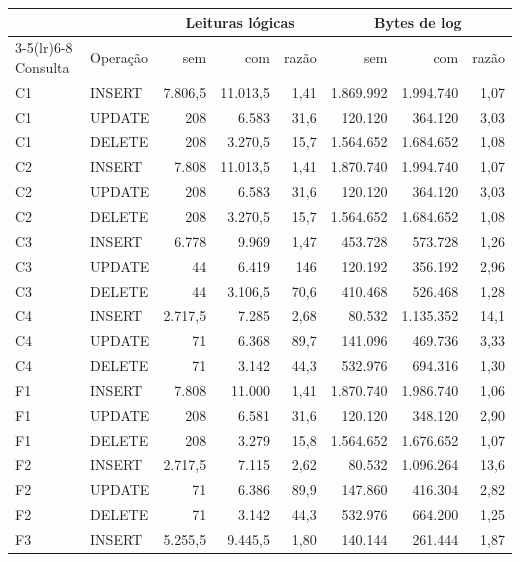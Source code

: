 {\small\setlength{\tabcolsep}{4pt}
\begin{tabular}{llrrrrrr}
\toprule
 &  & \multicolumn{3}{c}{Leituras lógicas} & \multicolumn{3}{c}{Bytes de log} \\
\cmidrule(lr){3-5}\cmidrule(lr){6-8}
Consulta & Operação & sem & com & razão & sem & com & razão \\
\midrule
C1 & INSERT & 7.806,5 & 11.013,5 & 1,41 & 1.869.992 & 1.994.740 & 1,07 \\
C1 & UPDATE & 208 & 6.583 & 31,6 & 120.120 & 364.120 & 3,03 \\
C1 & DELETE & 208 & 3.270,5 & 15,7 & 1.564.652 & 1.684.652 & 1,08 \\
C2 & INSERT & 7.808 & 11.013,5 & 1,41 & 1.870.740 & 1.994.740 & 1,07 \\
C2 & UPDATE & 208 & 6.583 & 31,6 & 120.120 & 364.120 & 3,03 \\
C2 & DELETE & 208 & 3.270,5 & 15,7 & 1.564.652 & 1.684.652 & 1,08 \\
C3 & INSERT & 6.778 & 9.969 & 1,47 & 453.728 & 573.728 & 1,26 \\
C3 & UPDATE & 44 & 6.419 & 146 & 120.192 & 356.192 & 2,96 \\
C3 & DELETE & 44 & 3.106,5 & 70,6 & 410.468 & 526.468 & 1,28 \\
C4 & INSERT & 2.717,5 & 7.285 & 2,68 & 80.532 & 1.135.352 & 14,1 \\
C4 & UPDATE & 71 & 6.368 & 89,7 & 141.096 & 469.736 & 3,33 \\
C4 & DELETE & 71 & 3.142 & 44,3 & 532.976 & 694.316 & 1,30 \\
F1 & INSERT & 7.808 & 11.000 & 1,41 & 1.870.740 & 1.986.740 & 1,06 \\
F1 & UPDATE & 208 & 6.581 & 31,6 & 120.120 & 348.120 & 2,90 \\
F1 & DELETE & 208 & 3.279 & 15,8 & 1.564.652 & 1.676.652 & 1,07 \\
F2 & INSERT & 2.717,5 & 7.115 & 2,62 & 80.532 & 1.096.264 & 13,6 \\
F2 & UPDATE & 71 & 6.386 & 89,9 & 147.860 & 416.304 & 2,82 \\
F2 & DELETE & 71 & 3.142 & 44,3 & 532.976 & 664.200 & 1,25 \\
F3 & INSERT & 5.255,5 & 9.445,5 & 1,80 & 140.144 & 261.444 & 1,87 \\

\end{tabular}}

